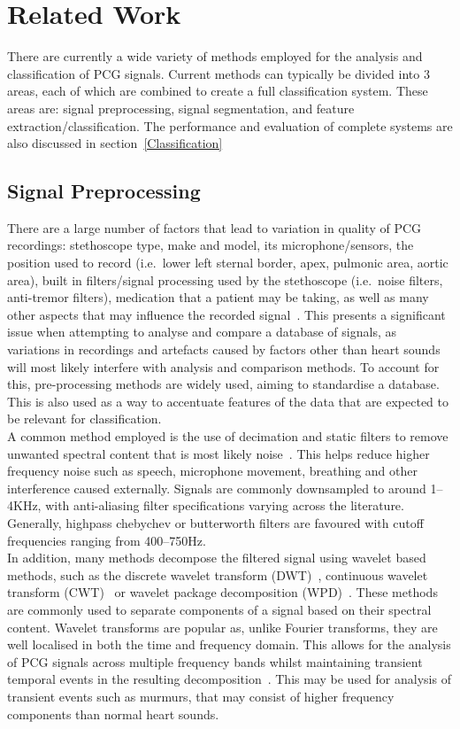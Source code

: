 \documentclass[titlepage, 12pt]{scrartcl} \usepackage{enumitem}
\begin{document}
\section{Related Work}
There are currently a wide variety of methods employed for the analysis and
classification of PCG signals. Current methods can typically be divided into 3
areas, each of which are combined to create a full classification system. These
areas are: signal preprocessing, signal segmentation, and feature
extraction/classification. The performance and evaluation of complete systems
are also discussed in section~\ref{Classification}


\subsection{Signal Preprocessing}
There are a large number of factors that lead to variation in quality of PCG
recordings: stethoscope type, make and model, its microphone/sensors, the
position used to record (i.e.\ lower left sternal border, apex, pulmonic area,
aortic area), built in filters/signal processing used by the stethoscope (i.e.\
noise filters, anti-tremor filters), medication that a patient may be taking,
as well as many other aspects that may influence the recorded
signal~\parencite[p.4]{Pavlopoulos2004}. This presents a significant issue when
attempting to analyse and compare a database of signals, as variations in
recordings and artefacts caused by factors other than heart sounds will most
likely interfere with analysis and comparison methods. To account for this,
pre-processing methods are widely used, aiming to standardise a database. This
is also used as a way to accentuate features of the data that are expected to
be relevant for classification.\\

A common method employed is the use of decimation and static filters to remove
unwanted spectral content that is most likely noise~\parencite{Liang1997a,
Homsi2016, Springer2016, Gupta2007}. This helps reduce higher frequency noise
such as speech, microphone movement, breathing and other interference caused
externally. Signals are commonly downsampled to around 1--4KHz, with
anti-aliasing filter specifications varying across the literature. Generally,
highpass chebychev or butterworth filters are favoured with cutoff frequencies
ranging from 400--750Hz.\\

In addition, many methods decompose the filtered signal using wavelet based
methods, such as the discrete wavelet transform (DWT)~\parencite{Liang1997a,
Pavlopoulos2004}, continuous wavelet transform (CWT)~\parencite{Langley2016} or
wavelet package decomposition (WPD)~\parencite{Liang1998}. These methods are
commonly used to separate components of a signal based on their spectral
content. Wavelet transforms are popular as, unlike Fourier transforms, they
are well localised in both the time and frequency domain. This allows for the
analysis of PCG signals across multiple frequency bands whilst maintaining
transient temporal events in the resulting
decomposition~\parencite[p.93]{Ari2008}. This may be used for analysis of
transient events such as murmurs, that may consist of higher frequency
components than normal heart sounds.
\end{document}
